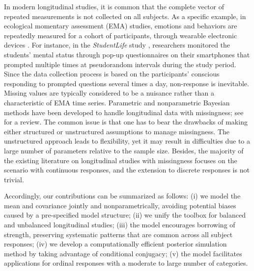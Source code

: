 In modern longitudinal studies, it is common that the complete vector of repeated measurements 
is not collected on all subjects. As a specific example, in ecological momentary assessment 
(EMA) studies, emotions and behaviors are repeatedly measured for a cohort of participants, 
through wearable electronic devices \citep{EMABook2018}. For instance, in the \textit{StudentLife} 
study \citep{StudentLife2014}, researchers monitored the students' mental status through 
pop-up questionnaires on their smartphones that prompted multiple times at pseudorandom 
intervals during the study period. Since the data collection process is based on the 
participants' conscious responding to prompted questions several times a day, non-response 
is inevitable. Missing values are typically considered to be a nuisance rather than a 
characteristic of EMA time series. Parametric and nonparametric Bayesian methods have been 
developed to handle longitudinal data with missingness; see \citet{Daniels2020} for a review. 
The common issue is that one has to bear the drawbacks of making either structured or 
unstructured assumptions to manage missingness. The unstructured approach leads to flexibility, 
yet it may result in difficulties due to a large number of parameters relative to the sample 
size. Besides, the majority of the existing literature on longitudinal studies with missingness 
focuses on the scenario with continuous responses, and the extension to discrete responses is not trivial. 


Accordingly, our contributions can be summarized as follows: (i) we model the mean and 
covariance jointly and nonparametrically, avoiding potential biases caused by a pre-specified 
model structure; (ii) we unify the toolbox for balanced and unbalanced longitudinal studies; 
(iii) the model encourages borrowing of strength, preserving systematic patterns that are 
common across all subject responses; (iv) we develop a computationally efficient posterior 
simulation method by taking advantage of conditional conjugacy; (v) the model facilitates 
applications for ordinal responses with a moderate to large number of categories. 


